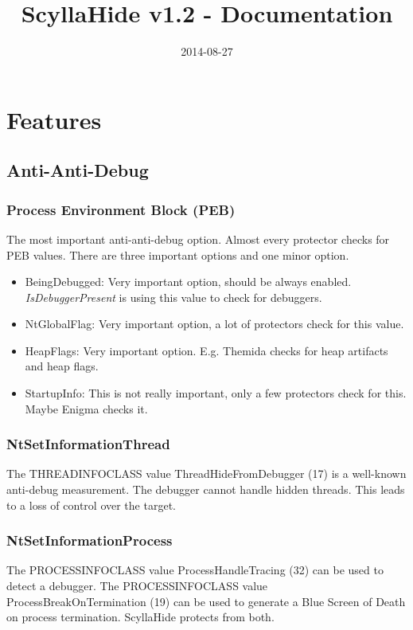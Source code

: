 \documentclass[10pt,a4paper]{article}
\title{ScyllaHide v1.2 - Documentation}
\author{}
\date{2014-08-27}
\begin{document}
\maketitle
 
\tableofcontents
\listoffigures
\lstlistoflistings

\newpage
{}

\section{Features}

\subsection{Anti-Anti-Debug}

\subsubsection{Process Environment Block (PEB)}
The most important anti-anti-debug option. Almost every protector checks for PEB values. There are three important options and one minor option.
\begin{itemize}
\item BeingDebugged: Very important option, should be always enabled. \textit{IsDebuggerPresent} is using this value to check for debuggers.
\item NtGlobalFlag: Very important option, a lot of protectors check for this value.
\item HeapFlags: Very important option. E.g. Themida checks for heap artifacts and heap flags.
\item StartupInfo: This is not really important, only a few protectors check for this. Maybe Enigma checks it.
\end{itemize}

\subsubsection{NtSetInformationThread}
\label{sec:NtSetInformationThread_section}
The THREADINFOCLASS value ThreadHideFromDebugger (17) is a well-known anti-debug measurement. The debugger cannot handle hidden threads. This leads to a loss of control over the target.

\subsubsection{NtSetInformationProcess}
\label{sec:NtSetInformationProcess_section}
The PROCESSINFOCLASS value ProcessHandleTracing (32) can be used to detect a debugger. The PROCESSINFOCLASS value ProcessBreakOnTermination (19) can be used to generate a Blue Screen of Death on process termination. ScyllaHide protects from both.
\end{document}
